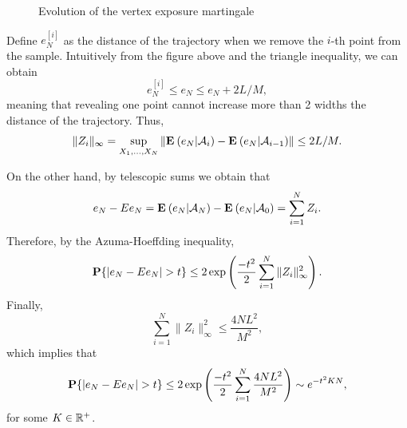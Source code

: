 \begin{figure}[ht]
    \caption{Evolution of the vertex exposure martingale}
\end{figure}

Define $e_N^{[i]}$ as the distance of the trajectory when we remove the $i$-th point from the sample. Intuitively from the figure above and the triangle inequality, we can obtain
\[ e_N^{[i]} \leq e_N \leq e_N + 2 L/M, \]
meaning that revealing one point cannot increase more than 2 widths the distance of the trajectory. Thus,
\[ \|Z_i\|_\infty = \sup_{X_1,\ldots, X_N} \|\E (e_N | \A_i) - \E (e_N | \A_{i-1})\| \leq 2L/M. \]

On the other hand, by telescopic sums we obtain that 
\[  e_N - E e_N = \E (e_N | \A_N) - \E (e_N | \A_{0}) = \sum_{i = 1}^{N} Z_i.\]
Therefore, by the Azuma-Hoeffding inequality,
\[ \P \{ |e_N - E e_N| > t \} \leq 2\exp\left(\frac{-t^2}{2}\sum_{i = 1}^{N} \|Z_i\|_{\infty}^2 \right). \] 
Finally,
\[ \sum_{i = 1}^{N} \|Z_i\|_{\infty}^2 \leq \frac{4NL^2}{M^2}, \]
which implies that
\[\P \{ |e_N - E e_N| > t \} \leq 2\exp\left(\frac{-t^2}{2}\sum_{i = 1}^{N} \frac{4NL^2}{M^2} \right) \sim e^{-t^{2} K N}, \] 
for some $K\in \R^+$.